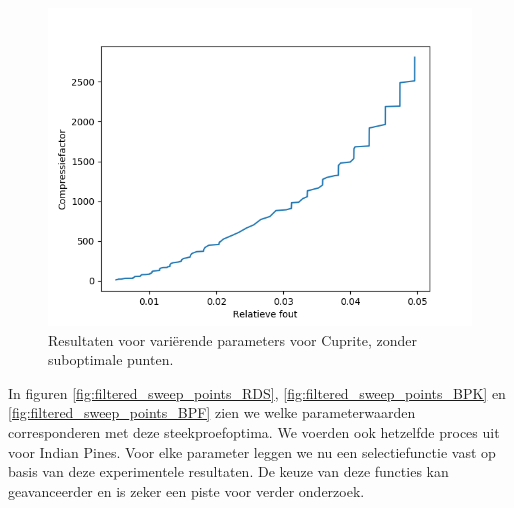 \begin{figure}[H]
  \centering
  \includegraphics[scale=0.7]{images/filtered_sweep_points_cuprite.png}
  \caption{Resultaten voor vari\"erende parameters voor Cuprite, zonder suboptimale punten.}
  \label{fig:filtered_sweep_points_cuprite}
\end{figure}

In figuren \ref{fig:filtered_sweep_points_RDS}, \ref{fig:filtered_sweep_points_BPK} en \ref{fig:filtered_sweep_points_BPF} zien we welke parameterwaarden corresponderen met deze steekproefoptima. We voerden ook hetzelfde proces uit voor Indian Pines. Voor elke parameter leggen we nu een selectiefunctie vast op basis van deze experimentele resultaten. De keuze van deze functies kan geavanceerder en is zeker een piste voor verder onderzoek.


